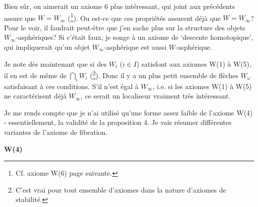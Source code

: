 \documentclass[11pt]{article}
\newcommand{\printedpage}[1]{\marginpar{\footnotesize p.~#1}}
\begin{document}
Bien sûr, on aimerait un axiome 6 plus intéressant, qui joint aux précédents assure que $W = W_\infty$ (\footnote[29]{Cf. axiome W(6) page suivante.}). Ou est-ce que ces propriétés assurent déjà que $W = W_\infty$? Pour le voir, il faudrait peut-être que j'en sache plus sur la structure des objets $W_\infty$-asphériques? Si c'était faux, je songe à un axiome de `descente homotopique', qui impliquerait qu'un objet $W_\infty$-asphérique est aussi $W$-asphérique.

\printedpage{11}

Je note dès maintenant que si des $W_i$ ($i \in I$) satisfont aux axiomes W(1) à W(5), il en est de même de $\bigcap_i W_i$ (\footnote[30]{C'est vrai pour tout ensemble d'axiomes dans la nature d'axiomes de stabilité.}). Donc il y a un plus petit ensemble de flèches $W_\omega$ satisfaisant à ces conditions. S'il n'est égal à $W_\infty$, i.e. si les axiomes W(1) à W(5) ne caractérisent déjà $W_\infty$, ce serait un localiseur vraiment très intéressant.

Je me rends compte que je n'ai utilisé qu'une forme assez faible de l'axiome W(4) - essentiellement, la validité de la proposition 4. Je vais résumer différentes variantes de l'axiome de fibration.

\textbf{W(4)}
\end{document}

